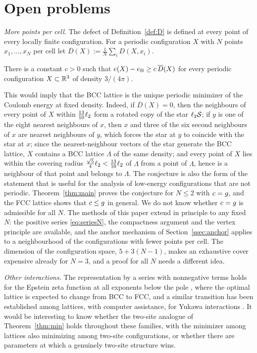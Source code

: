 \section{Open problems}\label{sec:outlook}

\emph{More points per cell.} The defect of Definition~\ref{def:D} is defined at every point of every locally finite configuration. For
a periodic configuration $X$ with $N$ points $x_1,\dots,x_N$ per cell let $\overline D(X):=\frac1N\sum_iD(X,x_i)$.

\begin{conjecture}\label{conj:all}
There is a constant $c>0$ such that $e(X)-e_{\mathrm B}\ge c\,\overline D(X)$ for every periodic configuration $X\subset\mathbb R^3$ of density
$3/(4\pi)$.
\end{conjecture}

This would imply that the BCC lattice is the unique periodic minimizer of the Coulomb energy at fixed density. Indeed, if
$\overline D(X)=0$, then the neighbours of every point of $X$ within $\frac{13}{10}\ell_2$ form a rotated copy of the star
$\ell_2\mathcal S$; if $y$ is one of the eight nearest neighbours of $x$, then $x$ and three of the six second neighbours of $x$ are
nearest neighbours of $y$, which forces the star at $y$ to coincide with the star at $x$; since the nearest-neighbour vectors
of the star generate the BCC lattice, $X$ contains a BCC lattice $\Lambda$ of the same density; and every point of $X$ lies within
the covering radius $\frac{\sqrt5}4\ell_2<\frac{13}{10}\ell_2$ of $\Lambda$ from a point of $\Lambda$, hence is a neighbour of that
point and belongs to $\Lambda$. The conjecture is also the form
of the statement that is useful for the analysis of low-energy configurations that are not periodic. Theorem~\ref{thm:main} proves the conjecture for $N\le2$ with $c=g$, and the FCC lattice shows that
$c\le g$ in general. We do not know whether $c=g$ is admissible for all $N$. The methods of this paper extend in principle to
any fixed $N$: the positive series \eqref{eq:seriesN}, the compactness argument and the vertex principle are available, and the
anchor mechanism of Section~\ref{ssec:anchor} applies to a neighbourhood of the configurations with fewer points per cell. The
dimension of the configuration space, $5+3(N-1)$, makes an exhaustive cover expensive already for $N=3$, and a proof for all $N$
needs a different idea.

\emph{Other interactions.} The representation by a series with nonnegative terms holds for the Epstein zeta function at all
exponents below the pole \cite{SarnakStrombergsson2006}, where the optimal lattice is expected to change from BCC to FCC, and a
similar transition has been established among lattices, with computer assistance, for Yukawa interactions \cite{LuoWei2026Yukawa}. It would be interesting to know whether the
two-site analogue of Theorem~\ref{thm:min} holds throughout these families, with the minimizer among lattices also minimizing among
two-site configurations, or whether there are parameters at which a genuinely two-site structure wins.

